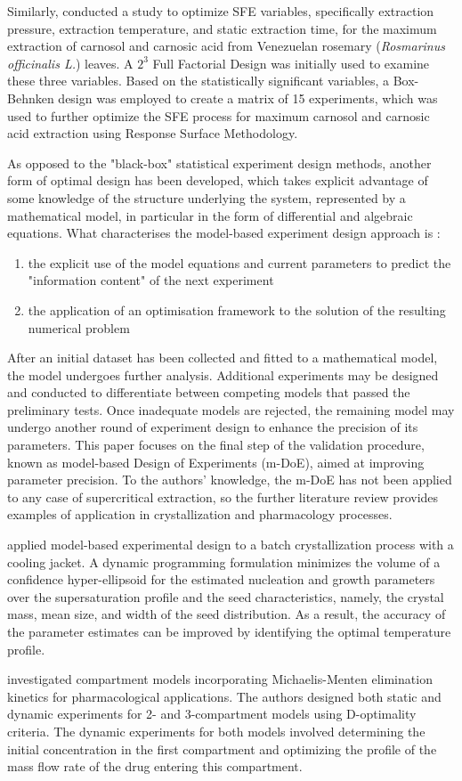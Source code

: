 \documentclass[../Article_Sensitivity_Analsysis.tex]{subfiles}
\begin{document}
	Similarly, \citet{Caldera2012} conducted a study to optimize SFE variables, specifically extraction pressure, extraction temperature, and static extraction time, for the maximum extraction of carnosol and carnosic acid from Venezuelan rosemary (\textit{Rosmarinus officinalis L.}) leaves. A $2^3$ Full Factorial Design was initially used to examine these three variables. Based on the statistically significant variables, a Box-Behnken design was employed to create a matrix of 15 experiments, which was used to further optimize the SFE process for maximum carnosol and carnosic acid extraction using Response Surface Methodology.
	
	As opposed to the "black-box" statistical experiment design methods, another form of optimal design has been developed, which takes explicit advantage of some knowledge of the structure underlying the system, represented by a mathematical model, in particular in the form of differential and algebraic equations. What characterises the model-based experiment design approach is :
	
	\begin{enumerate}
		\item the explicit use of the model equations and current parameters to predict the "information content" of the next experiment
		\item the application of an optimisation framework to the solution of the resulting numerical problem
	\end{enumerate}
	
	After an initial dataset has been collected and fitted to a mathematical model, the model undergoes further analysis. Additional experiments may be designed and conducted to differentiate between competing models that passed the preliminary tests. Once inadequate models are rejected, the remaining model may undergo another round of experiment design to enhance the precision of its parameters. This paper focuses on the final step of the validation procedure, known as model-based Design of Experiments (m-DoE), aimed at improving parameter precision. To the authors' knowledge, the m-DoE has not been applied to any case of supercritical extraction, so the further literature review provides examples of application in crystallization and pharmacology processes.
	
	\citet{Chung2000} applied model-based experimental design to a batch crystallization process with a cooling jacket. A dynamic programming formulation minimizes the volume of a confidence hyper-ellipsoid for the estimated nucleation and growth parameters over the supersaturation profile and the seed characteristics, namely, the crystal mass, mean size, and width of the seed distribution. As a result, the accuracy of the parameter estimates can be improved by identifying the optimal temperature profile.
	
	\citet{Duarte2019} investigated compartment models incorporating Michaelis-Menten elimination kinetics for pharmacological applications. The authors designed both static and dynamic experiments for 2- and 3-compartment models using D-optimality criteria. The dynamic experiments for both models involved determining the initial concentration in the first compartment and optimizing the profile of the mass flow rate of the drug entering this compartment.
	
\end{document}
